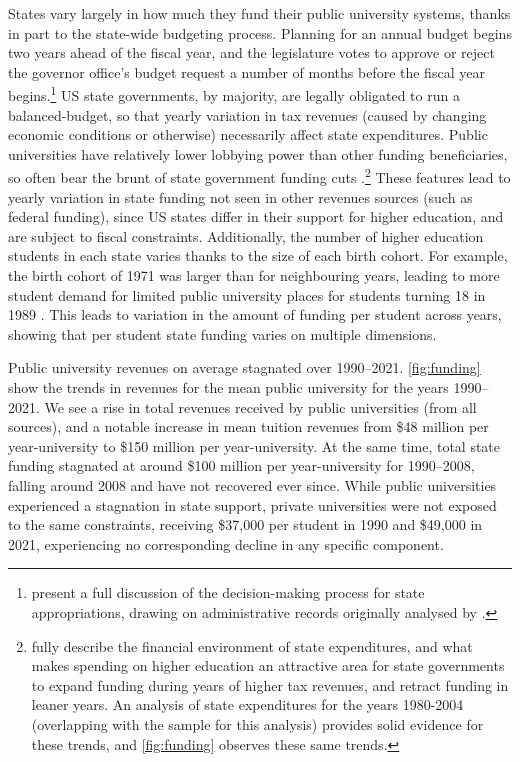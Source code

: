 States vary largely in how much they fund their public university systems, thanks in part to the state-wide budgeting process.
Planning for an annual budget begins two years ahead of the fiscal year, and the legislature votes to approve or reject the governor office's budget request a number of months before the fiscal year begins.\footnote{
    \cite{NBERw23736} present a full discussion of the decision-making process for state appropriations, drawing on administrative records originally analysed by \cite{parmley2009state}.
}
US state governments, by majority, are legally obligated to run a balanced-budget, so that yearly variation in tax revenues (caused by changing economic conditions or otherwise) necessarily affect state expenditures.
Public universities have relatively lower lobbying power than other funding beneficiaries, so often bear the brunt of state government funding cuts \citep{delaney2011state}.\footnote{
    \cite{delaney2011state} fully describe the financial environment of state expenditures, and what makes spending on higher education an attractive area for state governments to expand funding during years of higher tax revenues, and retract funding in leaner years.
    An analysis of state expenditures for the years 1980-2004 (overlapping with the sample for this analysis) provides solid evidence for these trends, and \autoref{fig:funding} observes these same trends.
}
These features lead to yearly variation in state funding not seen in other revenues sources (such as federal funding), since US states differ in their support for higher education, and are subject to fiscal constraints.
Additionally, the number of higher education students in each state varies thanks to the size of each birth cohort.
For example, the birth cohort of 1971 was larger than for neighbouring years, leading to more student demand for limited public university places for students turning 18 in 1989 \citep{bound2007cohort}.
This leads to variation in the amount of funding per student across years, showing that per student state funding varies on multiple dimensions.

Public university revenues on average stagnated over 1990--2021.
\autoref{fig:funding} show the trends in revenues for the mean public university for the years 1990--2021.
We see a rise in total revenues received by public universities (from all sources), and a notable increase in mean tuition revenues from \$48 million per year-university to \$150 million per year-university.
At the same time, total state funding stagnated at around \$100 million per year-university for 1990--2008, falling around 2008 and have not recovered ever since.
While public universities experienced a stagnation in state support, private universities were not exposed to the same constraints, receiving \$37,000 per student in 1990 and \$49,000 in 2021, experiencing no corresponding decline in any specific component.

